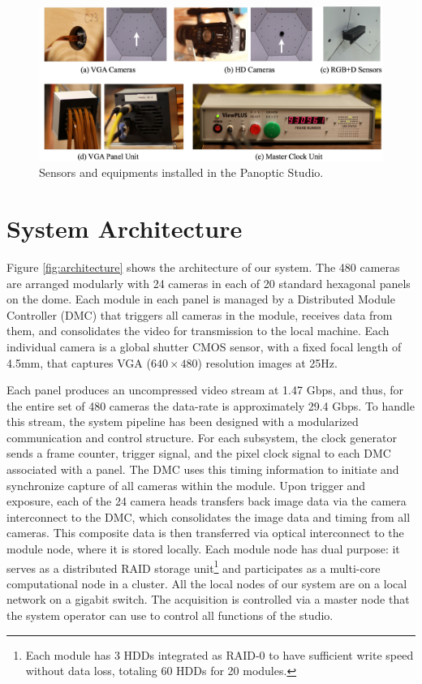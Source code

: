 	\begin{figure}
	\centering       
	\includegraphics[trim=0 0 0 0,clip,width=\linewidth]{figures/Equipment}
	\caption{Sensors and equipments installed in the Panoptic Studio. } 
	\label{fig:domeEquipment}
\end{figure}
\section{System Architecture}
Figure \ref{fig:architecture} shows the architecture of our system. The 480 cameras are arranged modularly with 24 cameras in each of 20 standard hexagonal panels on the dome. Each module in each panel is managed by a Distributed Module Controller (DMC) that triggers all cameras in the module, receives data from them, and consolidates the video for transmission to the local machine. Each individual camera is a global shutter CMOS sensor, with a fixed focal length of 4.5mm, that captures VGA ($640\times480$) resolution images at 25Hz. 

Each panel produces an uncompressed video stream at 1.47 Gbps, and thus, for the entire set of 480 cameras the data-rate is approximately 29.4 Gbps. To handle this stream, the system pipeline has been designed with a modularized communication and control structure. For each subsystem, the clock generator sends a frame counter, trigger signal, and the pixel clock signal to each DMC associated with a panel. The DMC uses this timing information to initiate and synchronize capture of all cameras within the module. Upon trigger and exposure, each of the 24 camera heads transfers back image data via the camera interconnect to the DMC, which consolidates the image data and timing from all cameras. This composite data is then transferred via optical interconnect to the module node, where it is stored locally. Each module node has dual purpose: it serves as a distributed RAID storage unit\footnote{Each module has 3 HDDs integrated as RAID-0 to have sufficient write speed without data loss, totaling 60 HDDs for 20 modules.} and participates as a multi-core computational node in a cluster. All the local nodes of our system are on a local network on a gigabit switch. The acquisition is controlled via a master node that the system operator can use to control all functions of the studio.

